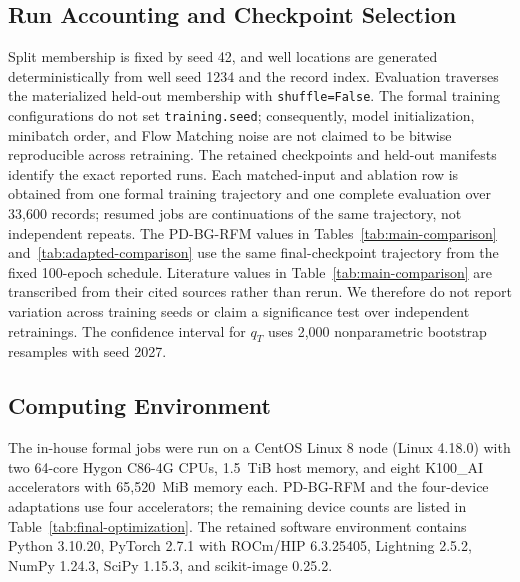 \documentclass[letterpaper]{article}
\begin{document}
\subsection{Run Accounting and Checkpoint Selection}
Split membership is fixed by seed 42, and well locations are generated deterministically from well seed 1234 and the record index. Evaluation traverses the materialized held-out membership with \texttt{shuffle=False}. The formal training configurations do not set \texttt{training.seed}; consequently, model initialization, minibatch order, and Flow Matching noise are not claimed to be bitwise reproducible across retraining. The retained checkpoints and held-out manifests identify the exact reported runs. Each matched-input and ablation row is obtained from one formal training trajectory and one complete evaluation over 33,600 records; resumed jobs are continuations of the same trajectory, not independent repeats. The PD-BG-RFM values in Tables~\ref{tab:main-comparison} and~\ref{tab:adapted-comparison} use the same final-checkpoint trajectory from the fixed 100-epoch schedule. Literature values in Table~\ref{tab:main-comparison} are transcribed from their cited sources rather than rerun. We therefore do not report variation across training seeds or claim a significance test over independent retrainings. The confidence interval for $q_T$ uses 2,000 nonparametric bootstrap resamples with seed 2027.

\subsection{Computing Environment}
The in-house formal jobs were run on a CentOS Linux 8 node (Linux 4.18.0) with two 64-core Hygon C86-4G CPUs, 1.5~TiB host memory, and eight K100\_AI accelerators with 65,520~MiB memory each. PD-BG-RFM and the four-device adaptations use four accelerators; the remaining device counts are listed in Table~\ref{tab:final-optimization}. The retained software environment contains Python 3.10.20, PyTorch 2.7.1 with ROCm/HIP 6.3.25405, Lightning 2.5.2, NumPy 1.24.3, SciPy 1.15.3, and scikit-image 0.25.2.
\end{document}
